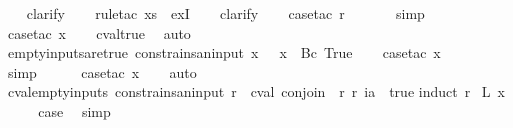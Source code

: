 \begin{isabellebody}
\ \ \isamarkupfalse%
\ clarify\isanewline
\ \ \isamarkupfalse%
\ {\isacharparenleft}rule{\isacharunderscore}tac\ x{\isacharequal}s\ \ exI{\isacharparenright}\isanewline
\ \ \isamarkupfalse%
\ clarify\isanewline
\ \ \isamarkupfalse%
\ {\isacharparenleft}case{\isacharunderscore}tac\ r{\isacharparenright}\isanewline
\ \ \ \ \ \isamarkupfalse%
\ simp\isanewline
\ \ \isamarkupfalse%
\ {\isacharparenleft}case{\isacharunderscore}tac\ x{}{\isacharparenright}\isanewline
\ \ \isamarkupfalse%
\ cval{\isacharunderscore}true\ \isamarkupfalse%
\ auto%
\endisatagproof
{\isafoldproof}%
%
\isadelimproof
\isanewline
%
\endisadelimproof
\isanewline
{}\isamarkupfalse%
\ empty{\isacharunderscore}inputs{\isacharunderscore}are{\isacharunderscore}true{\isacharcolon}\ {\isachardoublequoteopen}constrains{\isacharunderscore}an{\isacharunderscore}input\ x\ {\isasymLongrightarrow}\ {\isasymlbrakk}{\isasymrbrakk}\ x\ {\isacharequal}\ {\isacharbraceleft}{\isacharbar}Bc\ True{\isacharbar}{\isacharbraceright}{\isachardoublequoteclose}\isanewline
%
\isadelimproof
\ \ %
\endisadelimproof
%
\isatagproof
{}\isamarkupfalse%
\ {\isacharparenleft}case{\isacharunderscore}tac\ x{\isacharparenright}\isanewline
\ \ \ \ \ \isamarkupfalse%
\ simp\isanewline
\ \ \ \ \isamarkupfalse%
\ {\isacharparenleft}case{\isacharunderscore}tac\ x{}{\isacharparenright}\isanewline
\ \ \isamarkupfalse%
\ auto%
\endisatagproof
{\isafoldproof}%
%
\isadelimproof
\isanewline
%
\endisadelimproof
\isanewline
{}\isamarkupfalse%
\ cval{\isacharunderscore}empty{\isacharunderscore}inputs{\isacharcolon}\ {\isachardoublequoteopen}constrains{\isacharunderscore}an{\isacharunderscore}input\ r\ {\isasymlongrightarrow}\ cval\ {\isacharparenleft}conjoin\ {\isacharparenleft}{\isasymlbrakk}{\isasymrbrakk}\ r{\isacharparenright}{\isacharparenright}\ r\ ia\ {\isacharequal}\ true{\isachardoublequoteclose}\isanewline
%
\isadelimproof
%
\endisadelimproof
%
\isatagproof
{}\isamarkupfalse%
{\isacharparenleft}induct\ r{\isacharparenright}\isanewline
{}\isamarkupfalse%
\ {\isacharparenleft}L\ x{\isacharparenright}\isanewline
\ \ \isamarkupfalse%
\ \isamarkupfalse%
\ {\isacharquery}case\ \isamarkupfalse%
\ simp\isanewline
{}\isamarkupfalse%
\isanewline
\ \ \isamarkupfalse%

\end{isabellebody}
